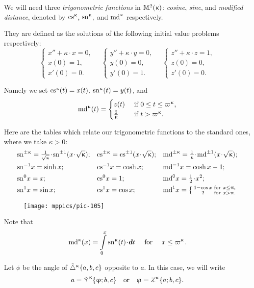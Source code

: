 We will need three \textit{trigonometric functions} in $\mathbb{M}_{{}}^{2}({\upkappa})$: {}\emph{cosine}, {}\emph{sine}, and {}\emph{modified distance}, denoted by $\cs\kappa$, $\sn\kappa$, and $\md\kappa$  respectively. 

They are defined as the solutions of the following initial value problems respectively:
\[
\begin{cases}
 x''+\kappa\cdot x=0,\\
 x(0)=1,\\
 x'(0)=0.
 \end{cases} 
 \quad 
 \begin{cases}
 y''+\kappa\cdot y=0,\\
 y(0)=0,\\
 y'(0)=1.
 \end{cases} 
\quad
 \begin{cases}
 z''+\kappa\cdot z=1,\\
 z(0)=0,\\
 z'(0)=0.
 \end{cases} 
\]

Namely we set $\mathrm{cs}^{\upkappa}(t)=x(t)$, $\mathrm{sn}^{\upkappa}(t)=y(t)$, and 
\[
\md\kappa(t)=
\begin{cases}
z(t)& \textrm{ if } 0\le t\le \varpi\kappa,
\\
\tfrac{2}{\kappa}& \textrm{ if } t> \varpi\kappa.
\end{cases}
\]

Here are the tables which relate our trigonometric functions to the standard ones, where 
we take $\kappa>0$:\index{$\md\kappa$}\index{$\sn\kappa$}\index{$\cs\kappa$}
{\small
\begin{align*}
&\sn{\pm\kappa}=\tfrac{1}{\sqrt{\kappa}}\cdot \sn{\pm1}({x}\cdot {\sqrt{\kappa}});
&
&\cs{\pm\kappa}=\cs{\pm1}({x}\cdot {\sqrt{\kappa}});
&
&\md{\pm\kappa}
=
\tfrac{1}{\kappa}\cdot \md{\pm1}({x}\cdot {\sqrt{\kappa}});
\\
&\sn{-1} x=\sinh x;
&
&\cs{-1} x=\cosh x;
&
&\md{-1} x=\cosh x-1;
\\
&\sn{0} x=x;
&
&\cs{0} x=1;
&
&\md{0} x=\tfrac{1}{2}\cdot x^2; 
\\
&\sn{1} x=\sin x;
&
&\cs{1} x= \cos x;
&
&\md{1} x
=
\left\{\begin{smallmatrix}
1-\cos x&\text{for}\ x\le \pi,
\\
2&\text{for}\ x >\pi.
\end{smallmatrix}
\right.
\end{align*}
}


{

\begin{wrapfigure}{r}{44mm}
\centering
\texttt{[image: mppics/pic-105]}
\end{wrapfigure}

Note that
\[
\mdk(x)=\int\limits_0^x
\snk(t)\cdot\dd t \quad \text{ for }\quad x\le \varpi\kappa.
\]

Let $\phi$ be the angle of ${\tilde\triangle}^{\upkappa}\{a,b,c\}$ 
opposite to $a$.
In this case, we will write \label{page:model-side}%
%
\[a
=
\side\kappa\{\phi;b,c\}
\quad \text{or}\quad 
\phi
=
\tangle\mc\kappa\{a;b,c\}.\]

}

